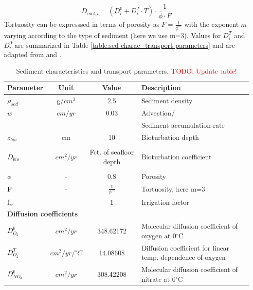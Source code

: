 \documentclass[gmd, manuscript]{copernicus}
\begin{document}
\begin{equation*}
 D_{mol,i} = (D^0_i + D^T_i \cdot T )\cdot \frac{1}{\phi\cdot F}
\end{equation*}
Tortuosity can be expresssed in terms of porosity as $F = \frac{1}{\phi^m}$ \citep{ullman_diffusion_1982} with the exponent $m$ varying according to the type of sediment (here we use m=3). 
Values for $D^T_i$ and $D^0_i$ are summarized in Table \ref{table:sed-charac_transport-parameters} and are adapted from \citet{Li_diffusion_1974} and \citet{gypens_simple_2008}.

\begin{table}[hbtp]
\caption{Sediment characteristics and transport parameters. \textcolor{red}{TODO: Update table!}}
\centering
\begin{tabular}{l c c l}
\hline\hline
Parameter & Unit  & Value & Description\\
\hline
$\rho_{sed}$ & g/$cm^3$ & 2.5 & Sediment density \\
$w$ & $cm/yr$ & 0.03 & Advection/\\
&&& Sediment accumulation rate \\
$z_{bio}$&	 cm & 10 & Bioturbation depth\\
&&&\citet{boudreau_mean_1998, teal_global_2010}\\
$D_{bio}$& $cm^2/yr$ & Fct. of seafloor depth & Bioturbation coefficient\\
&&&\citet{middelburg_empirical_1997}\\
$\phi$ & - & 0.8 & Porosity\\
F & - &  $\frac{1}{\phi^m}$ & Tortuosity, here m=3\\
f$_{ir}$ & - & 1 & Irrigation factor\\
\multicolumn{4}{l}{\textbf{Diffusion coefficients}}\\
$D_{O_2}^0$ & $cm^2/yr$ & 348.62172 &Molecular diffusion coefficient of oxygen at 0$^\circ$C\\
$D_{O_2}^T$ & $cm^2/yr/{}^{\circ}C$ & 14.08608 &Diffusion coefficient for linear temp. dependence of oxygen\\ %
$D_{NO_3}^0$ & $cm^2/yr$ & 308.42208 &Molecular diffusion coefficient of nitrate at 0$^\circ$C\\

\end{tabular}
\end{table}
\end{document}
